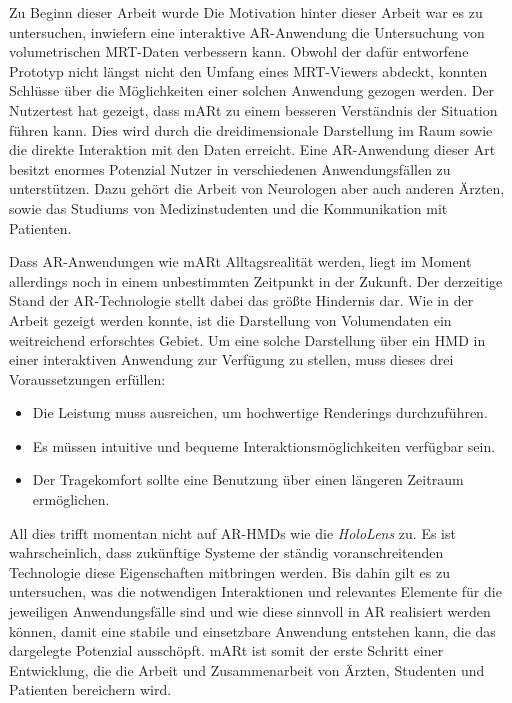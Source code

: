 Zu Beginn dieser Arbeit wurde
Die Motivation hinter dieser Arbeit war es zu untersuchen, inwiefern eine interaktive AR-Anwendung die Untersuchung von volumetrischen MRT-Daten verbessern kann. Obwohl der dafür entworfene Prototyp nicht längst nicht den Umfang eines MRT-Viewers abdeckt, konnten Schlüsse über die Möglichkeiten einer solchen Anwendung gezogen werden.
Der Nutzertest hat gezeigt, dass mARt zu einem besseren Verständnis der Situation führen kann. Dies wird durch die dreidimensionale Darstellung im Raum sowie die direkte Interaktion mit den Daten erreicht.
Eine AR-Anwendung dieser Art besitzt enormes Potenzial Nutzer in verschiedenen Anwendungsfällen zu unterstützen. Dazu gehört die Arbeit von Neurologen aber auch anderen Ärzten, sowie das Studiums von Medizinstudenten und die Kommunikation mit Patienten. 

Dass AR-Anwendungen wie mARt Alltagsrealität werden, liegt im Moment allerdings noch in einem unbestimmten Zeitpunkt in der Zukunft. 
Der derzeitige Stand der AR-Technologie stellt dabei das größte Hindernis dar. Wie in der Arbeit gezeigt werden konnte, ist die Darstellung von Volumendaten ein weitreichend erforschtes Gebiet. Um eine solche Darstellung über ein HMD in einer interaktiven Anwendung zur Verfügung zu stellen, muss dieses drei Voraussetzungen erfüllen:

\begin{itemize}
\item Die Leistung muss ausreichen, um hochwertige Renderings durchzuführen.
\item Es müssen intuitive und bequeme Interaktionsmöglichkeiten verfügbar sein.
\item Der Tragekomfort sollte eine Benutzung über einen längeren Zeitraum ermöglichen.
\end{itemize}

All dies trifft momentan nicht auf AR-HMDs wie die \textit{HoloLens} zu. Es ist wahrscheinlich, dass zukünftige Systeme der ständig voranschreitenden Technologie diese Eigenschaften mitbringen werden. 
Bis dahin gilt es zu untersuchen, was die notwendigen Interaktionen und relevantes Elemente für die jeweiligen Anwendungsfälle sind und wie diese sinnvoll in AR realisiert werden können, damit eine stabile und einsetzbare Anwendung entstehen kann, die das dargelegte Potenzial ausschöpft.
mARt ist somit der erste Schritt einer Entwicklung, die die Arbeit und Zusammenarbeit von Ärzten, Studenten und Patienten bereichern wird.

